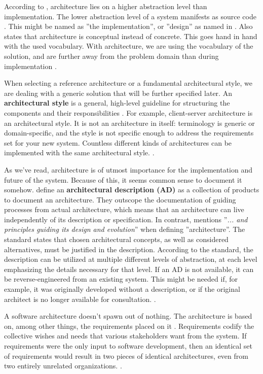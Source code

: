 \documentclass[utf8,english]{gradu3}
\begin{document}
According to \textcite{Koskimies2005}, architecture lies on a higher abstraction
level than implementation. The lower abstraction level of a system manifests as
source code \parencite[24]{Bass1998}. This might be named as ''the
implementation'', or ''design'' as named in \textcite{IEEE12207}. Also
\textcite[4]{IEEE42010} states that architecture is conceptual instead of
concrete. This goes hand in hand with the used vocabulary. With architecture, we
are using the vocabulary of the solution, and are further away from the problem
domain than during implementation \parencite{Koskimies2005}.

When selecting a reference architecture or a fundamental architectural style, we
are dealing with a generic solution that will be further specified later. An
\textbf{architectural style} is a general, high-level guideline for structuring
the components and their responsibilities \parencite[24]{Bass1998}. For example,
client-server architecture is an architectural style. It is not an architecture
in itself: terminology is generic or domain-specific, and the style is not
specific enough to address the requirements set for your new system. Countless
different kinds of architectures can be implemented with the same architectural
style. \parencite[24]{Bass1998}.

As we've read, architecture is of utmost importance for the implementation and
future of the system. Because of this, it seems common sense to document it
somehow. \textcite[24]{Bass1998} define an \textbf{architectural description
  (AD)} as a collection of products to document an architecture.
They outscope the documentation of
guiding processes from actual architecture, which means that an architecture
can live independently of its description or specification. In contrast,
\textcite[3]{IEEE42010} mentions ''\textit{... and principles guiding its design and
evolution}'' when defining ''architecture''. The standard states that chosen architectural concepts, as well as
considered alternatives, must be justified in the description. According to
the standard, the description can be utilized at multiple different
levels of abstraction, at each level emphasizing the details necessary for that
level. If an AD is not available, it can be reverse-engineered from an existing
system. This might be needed if, for example, it was originally developed
without a description, or if the original architect is no longer available for
consultation. \parencite[7, 67]{IEEE42010}.

A software architecture doesn't spawn out of nothing. The architecture is based on,
among other things, the requirements placed on it \parencite{Bass1998}.
Requirements codify the collective wishes and needs that various stakeholders
want from the system. If requirements were the only input to software
development, then an identical set of requirements would result in two pieces of
identical architectures, even from two entirely unrelated organizations.
\parencite[5-9]{Bass1998}.
\end{document}
